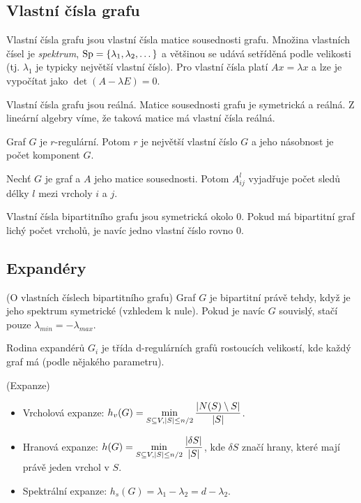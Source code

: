 
\subsection{Vlastní čísla grafu}

\df Vlastní čísla grafu jsou vlastní čísla matice sousednosti grafu. Množina
vlastních čísel je {\it spektrum}, $\operatorname{Sp} = \{\lambda_1, \lambda_2, \dots\}$ a
většinou se udává setříděná podle velikosti (tj. $\lambda_1$ je typicky
největší vlastní číslo). Pro vlastní čísla platí $Ax = \lambda x$ a lze je
vypočítat jako $\det(A - \lambda E) = 0$.

\vt Vlastní čísla grafu jsou reálná.
\dk Matice sousednosti grafu je symetrická a reálná. Z lineární algebry víme, že
taková matice má vlastní čísla reálná.

\vt Graf $G$ je $r$-regulární. Potom $r$ je největší vlastní číslo $G$ a jeho
násobnost je počet komponent $G$.

\vt Nechť $G$ je graf a $A$ jeho matice sousednosti. Potom $A^l_{ij}$ vyjadřuje
počet sledů délky $l$ mezi vrcholy $i$ a $j$.

\vt Vlastní čísla bipartitního grafu jsou symetrická okolo $0$. Pokud má
bipartitní graf lichý počet vrcholů, je navíc jedno vlastní číslo rovno $0$.

\subsection{Expandéry}

\vt (O vlastních číslech bipartitního grafu) Graf $G$ je bipartitní právě
tehdy, když je jeho spektrum symetrické (vzhledem k nule). Pokud je navíc $G$
souvislý, stačí pouze $\lambda_{min} = -\lambda_{max}$.

\df Rodina expandérů $G_i$ je třída d-regulárních grafů rostoucích velikostí,
kde každý graf má  (podle nějakého parametru).

\df (Expanze) \begin{itemize}
	\item Vrcholová expanze: $\displaystyle h_v(G) = \min_{S\subseteq V, |S|\leq n/2}
	{|N(S)\setminus S| \over |S|}$.
	\item Hranová expanze: $\displaystyle h(G) = \min_{S\subseteq V, |S|\leq n/2} {|\delta S|
	\over |S|}$, kde $\delta S$ značí hrany, které mají právě jeden vrchol v
	$S$.
	\item Spektrální expanze: $\displaystyle h_s(G) = \lambda_1 - \lambda_2 = d - \lambda_2$.
\end{itemize}

